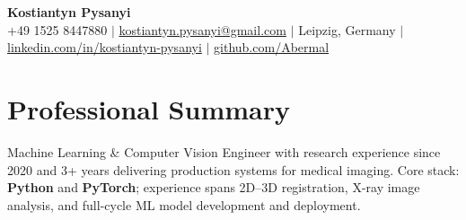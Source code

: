 \documentclass[letterpaper,10pt]{article}
\begin{document}
\begin{center}
  \textbf{\Huge Kostiantyn Pysanyi}\vspace{4pt} \\
  \small +49 1525 8447880 $|$ \href{mailto:kostiantyn.pysanyi@gmail.com}{kostiantyn.pysanyi@gmail.com} $|$ Leipzig, Germany $|$
  \href{https://www.linkedin.com/in/kostiantyn-pysanyi/}{linkedin.com/in/kostiantyn-pysanyi} $|$ \href{https://github.com/Abermal}{github.com/Abermal}
\end{center}
\addtolength{\topmargin}{-0.12in}
\enlargethispage{0.35in}
\vspace{-8pt}

\titlespacing*{\section}{0pt}{4pt}{4pt}



\section{Professional Summary}
Machine Learning \& Computer Vision Engineer with research experience since 2020 and 3+ years delivering production systems for medical imaging. Core stack: \textbf{Python} and \textbf{PyTorch}; experience spans 2D--3D registration, X-ray image analysis, and full-cycle ML model development and deployment.
\end{document}
